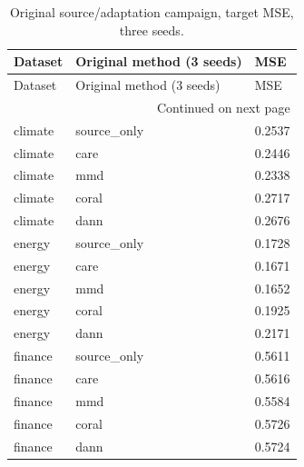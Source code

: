 {\footnotesize
\setlength{\tabcolsep}{3pt}
\renewcommand{\arraystretch}{1.17}
\begin{longtable}{@{}p{}p{}p{}@{}}
\caption{Original source/adaptation campaign, target MSE, three seeds.}\label{tab:original_table}\\
\toprule
Dataset & Original method (3 seeds) & MSE \\
\midrule\endfirsthead
Dataset & Original method (3 seeds) & MSE \\
\midrule\endhead
\midrule\multicolumn{3}{r}{Continued on next page}\\\endfoot
\bottomrule\endlastfoot
climate & source\_\allowbreak{}only & 0.2537 \\
climate & care & 0.2446 \\
climate & mmd & 0.2338 \\
climate & coral & 0.2717 \\
climate & dann & 0.2676 \\
energy & source\_\allowbreak{}only & 0.1728 \\
energy & care & 0.1671 \\
energy & mmd & 0.1652 \\
energy & coral & 0.1925 \\
energy & dann & 0.2171 \\
finance & source\_\allowbreak{}only & 0.5611 \\
finance & care & 0.5616 \\
finance & mmd & 0.5584 \\
finance & coral & 0.5726 \\
finance & dann & 0.5724 \\
\end{longtable}
}
